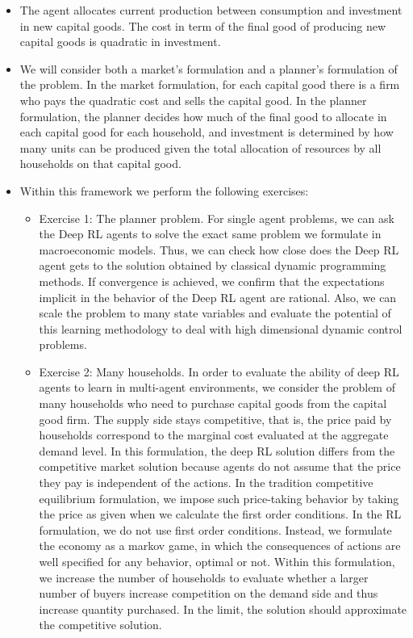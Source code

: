 \documentclass[11pt,english]{article}
\begin{document}
\begin{itemize}
	\item The agent allocates current production between consumption and investment in new capital goods. The cost in term of the final good of producing  new capital goods  is quadratic in investment.  \medskip
	
	\item  We will consider both a  market's formulation and a planner's formulation of the problem. In the market formulation, for each capital good there is a firm who pays the quadratic cost and sells the capital good. In the planner formulation, the planner decides how much of the final good to allocate in each capital good for each household, and investment is determined by how many units can be produced given the total allocation of resources by all households on that capital good. 
	
	\item Within this framework we perform the following exercises:
	
	\begin{itemize} 
		\item Exercise 1: The planner problem. For single agent problems, we can ask the Deep RL agents to solve the exact same problem we formulate in macroeconomic models. Thus, we can check how close does the Deep RL agent gets to the solution obtained by classical dynamic programming methods. If convergence is achieved, we confirm that the expectations implicit in the behavior of the Deep RL agent  are rational. Also, we can scale the problem to many state variables and evaluate the potential of this learning methodology to deal with high dimensional dynamic control problems. \medskip
		
		\item Exercise 2: Many households. In order to evaluate the ability of deep RL agents to learn in multi-agent environments, we consider the problem of many households who need to purchase capital goods from the capital good firm. The supply side stays competitive, that is, the price paid by households correspond to the marginal cost evaluated at the aggregate demand level. In this formulation, the deep RL solution differs from the competitive market solution because agents do not assume that the price they pay is independent of the actions. In the tradition competitive equilibrium formulation, we impose such price-taking behavior by taking the price as given when we calculate the first order conditions. In the RL formulation, we do not use first order conditions. Instead, we formulate the economy as a markov game, in which the consequences of actions are well specified for any behavior, optimal or not. Within this formulation, we increase the number of households to evaluate whether a larger number of buyers increase competition on the demand side and thus increase quantity purchased. In the limit, the solution should approximate the competitive solution.   \medskip
		

\end{itemize}
\end{itemize}
\end{document}
